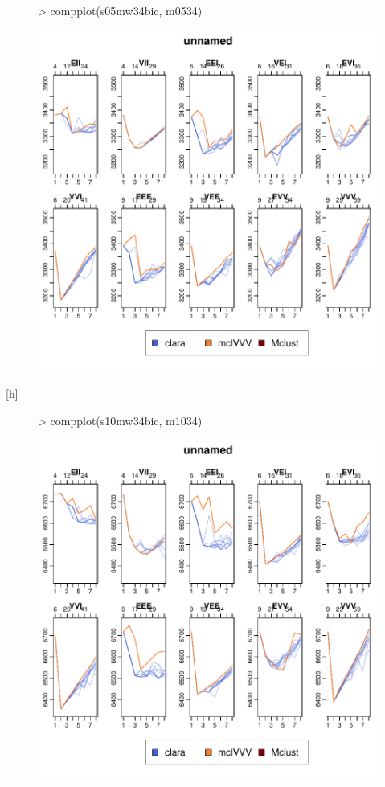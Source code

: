 \begin{figure}[h]
    \centering
\begin{Schunk}
\begin{Sinput}
>     compplot(s05mw34bic, m0534)
\end{Sinput}
\end{Schunk}
\includegraphics{chapter3-fig5fit}
\end{figure}[h]
\begin{figure}
\begin{Schunk}
\begin{Sinput}
>     compplot(s10mw34bic, m1034)
\end{Sinput}
\end{Schunk}
\includegraphics{chapter3-fig10fit}
\end{figure}


